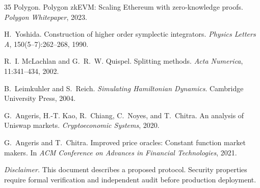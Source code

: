 \documentclass[11pt,twocolumn]{article}
\begin{document}
\begin{thebibliography}{35}
Polygon.
\newblock Polygon {zkEVM}: Scaling {Ethereum} with zero-knowledge proofs.
\newblock \emph{Polygon Whitepaper}, 2023.

H.~Yoshida.
\newblock Construction of higher order symplectic integrators.
\newblock \emph{Physics Letters A}, 150(5--7):262--268, 1990.

R.~I. McLachlan and G.~R.~W. Quispel.
\newblock Splitting methods.
\newblock \emph{Acta Numerica}, 11:341--434, 2002.

B.~Leimkuhler and S.~Reich.
\newblock \emph{Simulating Hamiltonian Dynamics}.
\newblock Cambridge University Press, 2004.

G.~Angeris, H.-T. Kao, R.~Chiang, C.~Noyes, and T.~Chitra.
\newblock An analysis of {Uniswap} markets.
\newblock \emph{Cryptoeconomic Systems}, 2020.

G.~Angeris and T.~Chitra.
\newblock Improved price oracles: Constant function market makers.
\newblock In \emph{ACM Conference on Advances in Financial Technologies}, 2021.

\end{thebibliography}

\vspace{1em}
\noindent\textit{Disclaimer.} This document describes a proposed protocol. Security properties require formal verification and independent audit before production deployment.
\end{document}
